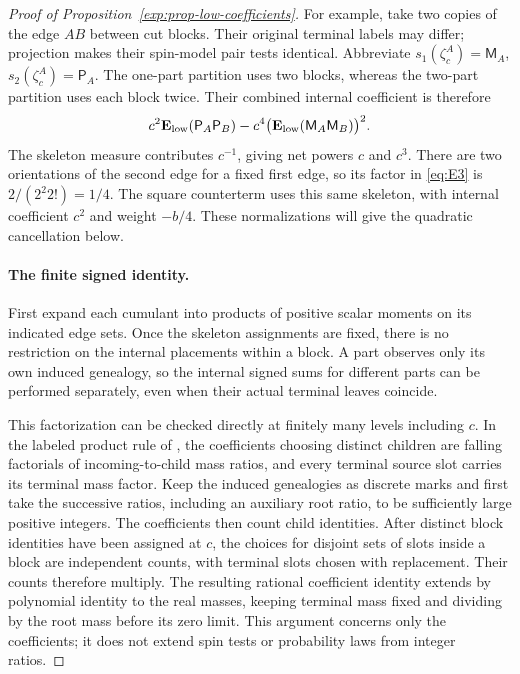 \begin{proof}[Proof of Proposition~\ref{exp:prop-low-coefficients}]
For example, take two copies of the edge \(AB\) between cut blocks.
Their original terminal labels may differ; projection makes their
spin-model pair tests identical. Abbreviate
\(s_1(\zeta^A_c)=\mathsf M_A\),
\(s_2(\zeta^A_c)=\mathsf P_A\). The one-part partition uses two
blocks, whereas the two-part partition uses each block twice. Their
combined internal coefficient is therefore
\[
 c^2\mathbf E_{\rm low}(\mathsf P_A\mathsf P_B)
   -c^4\bigl(\mathbf E_{\rm low}(\mathsf M_A\mathsf M_B)\bigr)^2.
\]
The skeleton measure contributes \(c^{-1}\), giving net powers
\(c\) and \(c^3\). There are two orientations of the second edge
for a fixed first edge, so its factor in \eqref{eq:E3} is
\(2/(2^2 2!)=1/4\). The square counterterm uses this same skeleton,
with internal coefficient \(c^2\) and weight \(-b/4\). These
normalizations will give the quadratic cancellation below.

\paragraph{The finite signed identity.}
First expand each cumulant into products of positive scalar moments
on its indicated edge sets. Once the skeleton assignments are fixed,
there is no restriction on the internal placements within a block.
A part observes only its own induced genealogy, so the internal
signed sums for different parts can be performed separately, even
when their actual terminal leaves coincide.

This factorization can be checked directly at finitely many levels
including \(c\). In the labeled product rule of
\cite[Proposition~2.5]{PE}, the coefficients choosing distinct children
are falling factorials of incoming-to-child mass ratios, and every
terminal source slot carries its terminal mass factor. Keep the
induced genealogies as discrete marks and first take the successive
ratios, including an auxiliary root ratio, to be sufficiently large
positive integers. The coefficients then count child identities.
After distinct block identities have been assigned at \(c\), the
choices for disjoint sets of slots inside a block are independent
counts, with terminal slots chosen with replacement. Their counts
therefore multiply. The resulting rational coefficient identity
extends by polynomial identity to the real masses, keeping terminal
mass fixed and dividing by the root mass before its zero limit.
This argument concerns only the coefficients; it does not extend
spin tests or probability laws from integer ratios.


\end{proof}
